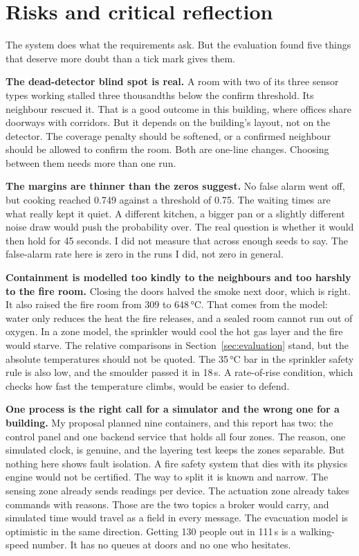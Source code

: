 \section{Risks and critical reflection}\label{sec:risks}

The system does what the requirements ask. But the evaluation found five things
that deserve more doubt than a tick mark gives them.

\textbf{The dead-detector blind spot is real.} A room with two of its three sensor
types working stalled three thousandths below the confirm threshold. Its neighbour
rescued it. That is a good outcome in this building, where offices share doorways
with corridors. But it depends on the building's layout, not on the detector. The
coverage penalty should be softened, or a confirmed neighbour should be allowed to
confirm the room. Both are one-line changes. Choosing between them needs more than
one run.

\textbf{The margins are thinner than the zeros suggest.} No false alarm went off,
but cooking reached 0.749 against a threshold of 0.75. The waiting times are what
really kept it quiet. A different kitchen, a bigger pan or a slightly different
noise draw would push the probability over. The real question is whether it would
then hold for 45 seconds. I did not measure that across enough seeds to say. The
false-alarm rate here is zero in the runs I did, not zero in general.

\textbf{Containment is modelled too kindly to the neighbours and too harshly to
the fire room.} Closing the doors halved the smoke next door, which is right. It
also raised the fire room from 309 to 648\,°C. That comes from the model: water
only reduces the heat the fire releases, and a sealed room cannot run out of
oxygen. In a zone model, the sprinkler would cool the hot gas layer and the fire
would starve. The relative comparisons in Section~\ref{sec:evaluation} stand, but the absolute
temperatures should not be quoted. The 35\,°C bar in the sprinkler safety rule is
also low, and the smoulder passed it in 18\,s. A rate-of-rise condition, which
checks how fast the temperature climbs, would be easier to defend.

\textbf{One process is the right call for a simulator and the wrong one for a
building.} My proposal planned nine containers, and this report has two: the
control panel and one backend service that holds all four zones. The
reason, one simulated clock, is genuine, and the layering test keeps the zones
separable. But nothing here shows fault isolation. A fire safety system that dies
with its physics engine would not be certified. The way to split it is known and
narrow. The sensing zone already sends readings per device. The actuation zone
already takes commands with reasons. Those are the two topics a broker would
carry, and simulated time would travel as a field in every message. The
evacuation model is optimistic in the same direction. Getting 130 people out in
111\,s is a walking-speed number. It has no queues at doors and no one who
hesitates.

